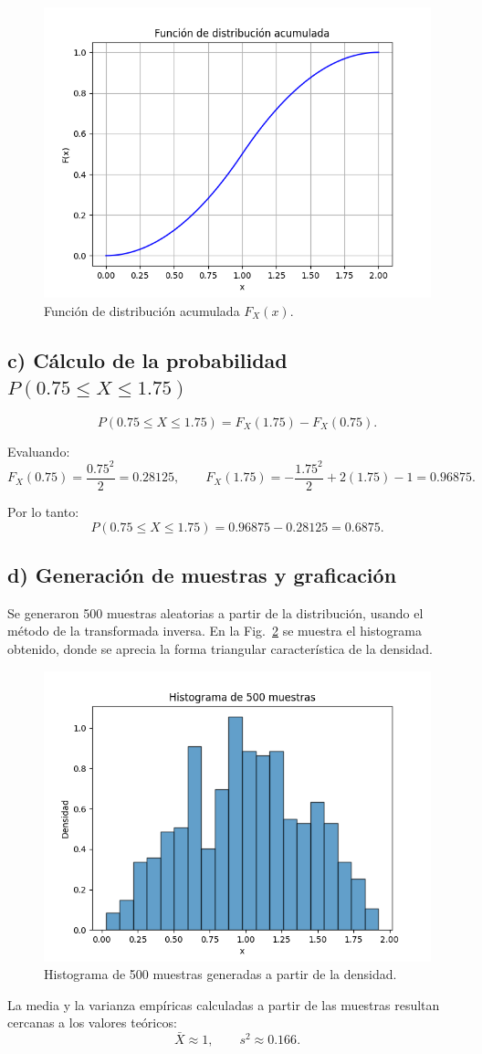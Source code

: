 \begin{figure}[H]
    \centering
    \includegraphics[width=0.6\linewidth]{imagenes/Actividad_3/cdf.png}
    \caption{Función de distribución acumulada \(F_X(x)\).}
    \label{fig:cdf}
\end{figure}

\subsection*{c) Cálculo de la probabilidad \( P(0.75 \leq X \leq 1.75) \)}

\[
P(0.75 \leq X \leq 1.75) = F_X(1.75) - F_X(0.75).
\]

Evaluando:
\[
F_X(0.75) = \frac{0.75^2}{2} = 0.28125,
\qquad
F_X(1.75) = -\frac{1.75^2}{2} + 2(1.75) - 1 = 0.96875.
\]

Por lo tanto:
\[
P(0.75 \leq X \leq 1.75) = 0.96875 - 0.28125 = 0.6875.
\]

\subsection*{d) Generación de muestras y graficación}

Se generaron 500 muestras aleatorias a partir de la distribución, usando el método de la transformada inversa.  
En la Fig.~\ref{fig:histograma} se muestra el histograma obtenido, donde se aprecia la forma triangular característica de la densidad.

\begin{figure}[H]
    \centering
    \includegraphics[width=0.6\linewidth]{imagenes/Actividad_3/histograma.png}
    \caption{Histograma de 500 muestras generadas a partir de la densidad.}
    \label{fig:histograma}
\end{figure}

La media y la varianza empíricas calculadas a partir de las muestras resultan cercanas a los valores teóricos:
\[
\bar{X} \approx 1, \qquad s^2 \approx 0.166.
\]

